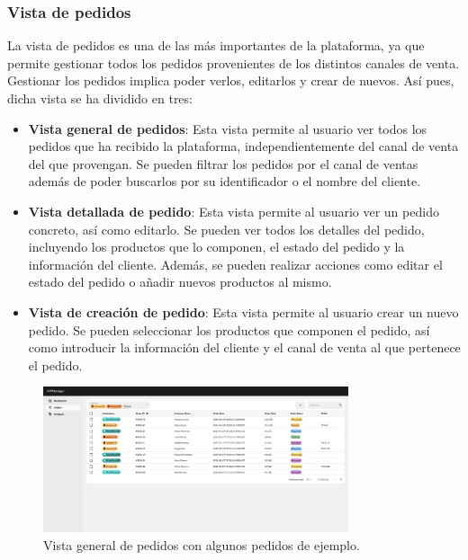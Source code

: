 \subsubsection{Vista de pedidos}
\label{dev:subsubsec:vista_pedidos}

La vista de pedidos es una de las más importantes de la plataforma, ya que permite gestionar todos los pedidos provenientes de los distintos canales de venta. Gestionar los pedidos implica poder verlos, editarlos y crear de nuevos. Así pues, dicha vista se ha dividido en tres:

\begin{itemize}
    \item \textbf{Vista general de pedidos}: Esta vista permite al usuario ver todos los pedidos que ha recibido la plataforma, independientemente del canal de venta del que provengan. Se pueden filtrar los pedidos por el canal de ventas además de poder buscarlos por su identificador o el nombre del cliente.
    \item \textbf{Vista detallada de pedido}: Esta vista permite al usuario ver un pedido concreto, así como editarlo. Se pueden ver todos los detalles del pedido, incluyendo los productos que lo componen, el estado del pedido y la información del cliente. Además, se pueden realizar acciones como editar el estado del pedido o añadir nuevos productos al mismo.
    \item \textbf{Vista de creación de pedido}: Esta vista permite al usuario crear un nuevo pedido. Se pueden seleccionar los productos que componen el pedido, así como introducir la información del cliente y el canal de venta al que pertenece el pedido.
\end{itemize}

\begin{figure}[H]
    \centering
    \includegraphics[width=0.8\textwidth]{figures/design_develop/screenshots/tabla_pedidos.png}
    \caption{Vista general de pedidos con algunos pedidos de ejemplo.}
    \label{fig:dev:ss:vista_general_pedidos}
\end{figure}


